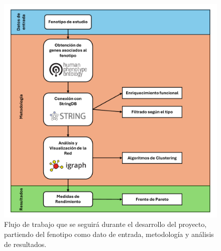 
\begin{figure}[h]
	\centering
	\includegraphics[width=1\linewidth]{figures/methods/Flujo_de_trabajo.pdf}
	\caption{Flujo de trabajo que se seguirá durante el desarrollo del proyecto, partiendo del fenotipo como dato de entrada, metodología y análisis de resultados.}
	\label{fig:flujo_trabajo}
\end{figure}
